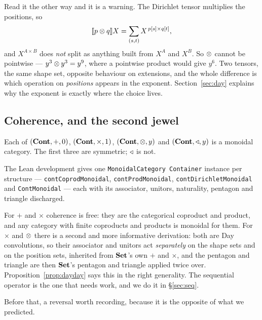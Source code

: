 Read it the other way and it is a warning. The Dirichlet tensor multiplies the
positions, so
\[
  \llbracket p\mathbin{\otimes} q \rrbracket X=\sum_{(s,t)}X^{\,p[s]\times q[t]},
\]
and $X^{A\times B}$ does \emph{not} split as anything built from $X^A$ and
$X^B$. So $\mathbin{\otimes}$ cannot be pointwise --- $y^3\mathbin{\otimes} y^3=y^9$, where a pointwise
product would give $y^6$. Two tensors, the same shape set, opposite behaviour on
extensions, and the whole difference is which operation on \emph{positions}
appears in the exponent. Section~\ref{sec:day} explains why the exponent is
exactly where the choice lives.

\subsection{Coherence, and the second jewel}

\begin{Theorem}\label{thm:fourmonoidal}
Each of $(\mathbf{Cont},+,0)$, $(\mathbf{Cont},\times,1)$, $(\mathbf{Cont},\mathbin{\otimes},y)$ and
$(\mathbf{Cont},\mathbin{\triangleleft},y)$ is a monoidal category. The first three are symmetric; $\mathbin{\triangleleft}$
is not.
\end{Theorem}

The Lean development gives one \texttt{MonoidalCategory Container} instance per
structure --- \texttt{contCoprodMonoidal}, \texttt{contProdMonoidal},
\texttt{contDirichletMonoidal} and \texttt{ContMonoidal} --- each with its
associator, unitors, naturality, pentagon and triangle discharged.

For $+$ and $\times$ coherence is free: they are the categorical coproduct and
product, and any category with finite coproducts and products is monoidal for
them. For $\times$ and $\mathbin{\otimes}$ there is a second and more informative derivation:
both are Day convolutions, so their associator and unitors act
\emph{separately} on the shape sets and on the position sets, inherited from
$\mathbf{Set}$'s own $+$ and $\times$, and the pentagon and triangle are then $\mathbf{Set}$'s
pentagon and triangle applied twice over. Proposition~\ref{prop:dayday} says
this in the right generality. The sequential operator is the one that needs
work, and we do it in §\ref{sec:seq}.

Before that, a reversal worth recording, because it is the opposite of what we
predicted.

